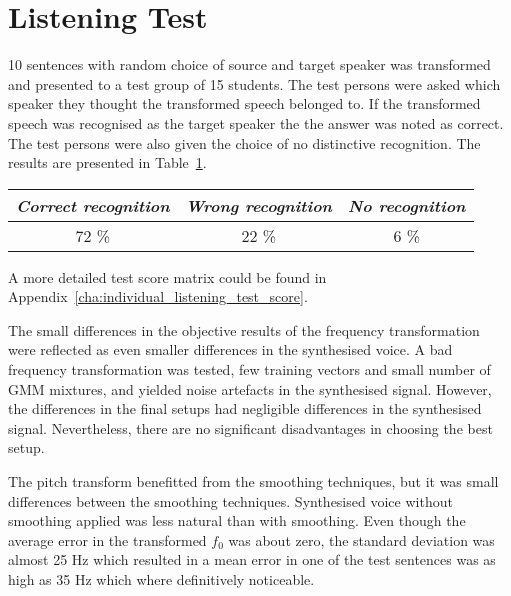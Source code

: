 \section{Listening Test} %
\label{sec:listening_test}
10 sentences with random choice of source and target speaker was transformed and presented to a test group of 15 students. The test persons were asked which speaker they thought the transformed speech belonged to. If the transformed speech was recognised as the target speaker the the answer was noted as correct. The test persons were also given the choice of no distinctive recognition. The results are presented in Table~\ref{tab:subjective_listening_results}.
\begin{table}[htbp]
	\begin{center}
		\label{tab:subjective_listening_results}
		\begin{tabular}{ccc}
			\toprule
			\multicolumn{1}{c}{\emph{Correct recognition}} & \multicolumn{1}{c}{\emph{Wrong recognition}} & \multicolumn{1}{c}{\emph{No recognition}}\\
			\midrule
			72 \% & 22 \% & 6 \% \\
			\bottomrule			
		\end{tabular}		
	\end{center}	
\end{table}
A more detailed test score matrix could be found in Appendix~\ref{cha:individual_listening_test_score}.

The small differences in the objective results of the frequency transformation were reflected as even smaller differences in the synthesised voice. A bad frequency transformation was tested, \ie few training vectors and small number of GMM mixtures, and yielded noise artefacts in the synthesised signal. However, the differences in the final setups had negligible differences in the synthesised signal. Nevertheless, there are no significant disadvantages in choosing the best setup.

The pitch transform benefitted from the smoothing techniques, but it was small differences between the smoothing techniques. Synthesised voice without smoothing applied was less natural than with smoothing. Even though the average error in the transformed $f_0$ was about zero, the standard deviation was almost 25 Hz which resulted in a mean error in one of the test sentences was as high as 35 Hz which where definitively noticeable.

